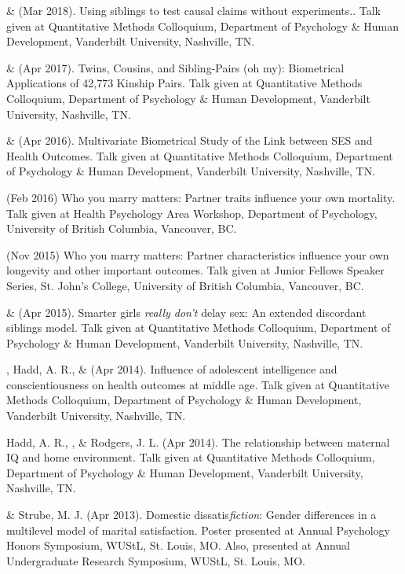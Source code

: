 \item\meb \& \Joe (Mar 2018). Using siblings to test causal claims without experiments.. Talk given at Quantitative Methods Colloquium, Department of Psychology \& Human Development, Vanderbilt University, Nashville, TN. 
\item\meb \& \Joe (Apr 2017). Twins, Cousins, and Sibling-Pairs (oh my): Biometrical Applications of 42,773 Kinship Pairs. Talk given at Quantitative Methods Colloquium, Department of Psychology \& Human Development, Vanderbilt University, Nashville, TN. \href{https://osf.io/uyqwd/}{\color{blue}{https://osf.io/uyqwd/}}
\item\meb \& \Joe (Apr 2016). Multivariate Biometrical Study of the Link between SES and Health Outcomes. Talk given at Quantitative Methods Colloquium, Department of Psychology \& Human Development, Vanderbilt University, Nashville, TN.
\item \meb (Feb 2016) Who you marry matters: Partner traits influence your own mortality. Talk given at Health Psychology Area Workshop, Department of Psychology, University of British Columbia, Vancouver, BC. \href{https://osf.io/jbf96/}{\color{blue}{https://osf.io/jbf96/}}
\item \meb (Nov 2015) Who you marry matters: Partner characteristics influence your own longevity and other important outcomes. Talk given at Junior Fellows Speaker Series, St. John's College, University of British Columbia, Vancouver, BC. \href{https://osf.io/zqv5t/}{\color{blue}{https://osf.io/zqv5t/}}
\item\meb \& \Joe (Apr 2015). Smarter girls \textit{really don't} delay sex: An extended discordant siblings model. Talk given at Quantitative Methods Colloquium, Department of Psychology \& Human Development, Vanderbilt University, Nashville, TN.
\item\meb, Hadd, A. R., \& \Joe (Apr 2014). Influence of adolescent intelligence and conscientiousness on health outcomes at middle age. Talk given at Quantitative Methods Colloquium, Department of Psychology \& Human Development, Vanderbilt University, Nashville, TN. 

\item Hadd, A. R., \meb, \& Rodgers, J. L. (Apr 2014). The relationship between maternal IQ and home environment. Talk given at Quantitative Methods Colloquium, Department of Psychology \& Human Development, Vanderbilt University, Nashville, TN.
\item\meb \& Strube, M. J. (Apr 2013). Domestic dissatis{\em fiction}: Gender differences in a multilevel model of marital satisfaction. Poster presented at Annual Psychology Honors Symposium, WUStL, St. Louis, MO. Also, presented at Annual Undergraduate Research Symposium, WUStL, St. Louis, MO.
\smallskip\\
